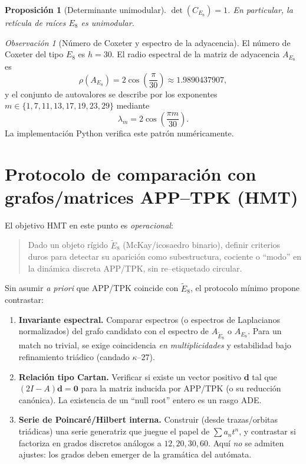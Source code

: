 \documentclass[11pt,a4paper]{article}
\newtheorem{proposition}{Proposición}
\theoremstyle{definition}
\theoremstyle{remark}
\newtheorem{remark}{Observación}
\begin{document}
\begin{proposition}[Determinante unimodular]
$\det(C_{E_8})=1$. En particular, la retícula de raíces $E_8$ es unimodular.
\end{proposition}

\begin{remark}[Número de Coxeter y espectro de la adyacencia]
El número de Coxeter del tipo $E_8$ es $h=30$.
El radio espectral de la matriz de adyacencia $A_{E_8}$ es
\[
\rho(A_{E_8}) = 2\cos\!\left(\frac{\pi}{30}\right)\approx 1.9890437907,
\]
y el conjunto de autovalores se describe por los exponentes $m\in\{1,7,11,13,17,19,23,29\}$ mediante
\[
\lambda_m = 2\cos\!\left(\frac{\pi m}{30}\right).
\]
La implementación Python verifica este patrón numéricamente.
\end{remark}

\section{Protocolo de comparación con grafos/matrices APP--TPK (HMT)}
El objetivo HMT en este punto es \emph{operacional}:

\begin{quote}
Dado un objeto rígido $\widetilde{E}_8$ (McKay/icosaedro binario), definir criterios duros para detectar su aparición
como subestructura, cociente o ``modo'' en la dinámica discreta APP/TPK, sin re--etiquetado circular.
\end{quote}

Sin asumir \emph{a priori} que APP/TPK coincide con $\widetilde{E}_8$, el protocolo mínimo propone contrastar:

\begin{enumerate}
\item \textbf{Invariante espectral.} Comparar espectros (o espectros de Laplacianos normalizados) del grafo candidato
con el espectro de $A_{\widetilde{E}_8}$ o $A_{E_8}$. Para un match no trivial, se exige coincidencia
\emph{en multiplicidades} y estabilidad bajo refinamiento triádico (candado $\kappa$--$27$).
\item \textbf{Relación tipo Cartan.} Verificar si existe un vector positivo $\bm d$ tal que $(2I-A)\bm d=\bm0$
para la matriz inducida por APP/TPK (o su reducción canónica). La existencia de un ``null root'' entero es un rasgo ADE.
\item \textbf{Serie de Poincaré/Hilbert interna.} Construir (desde trazas/orbitas triádicas) una serie generatriz
que juegue el papel de $\sum a_n t^n$, y contrastar si factoriza en grados discretos análogos a $12,20,30,60$.
Aquí \emph{no} se admiten ajustes: los grados deben emerger de la gramática del autómata.
\end{enumerate}
\end{document}
